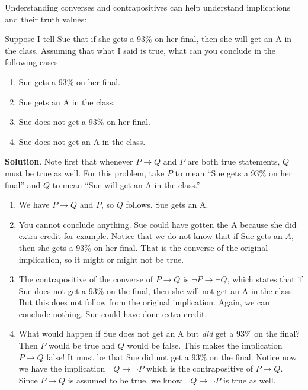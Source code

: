 \documentclass[11pt,]{book}
\theoremstyle{ptxplainnotitle}
\theoremstyle{ptxplaintitle}
\theoremstyle{ptxdefinitionnotitle}
\theoremstyle{ptxdefinitiontitle}
\theoremstyle{ptxdefinitionnotitle}
\theoremstyle{ptxdefinitiontitle}
\theoremstyle{ptxdefinitionnotitle}
\theoremstyle{ptxdefinitiontitle}
\theoremstyle{ptxdefinitiontitlenonumber}
\theoremstyle{ptxdefinitiontitlenonumber}
\numberwithin{equation}{chapter}
\newcommand{\imp}{\rightarrow}
\begin{document}
\hypertarget{p-1843}{}%
Understanding converses and contrapositives can help understand implications and their truth values:%
\begin{example}\label{example-52}
\hypertarget{p-1844}{}%
Suppose I tell Sue that if she gets a 93\% on her final, then she will get an A in the class. Assuming that what I said is true, what can you conclude in the following cases:%
\par
\hypertarget{p-1845}{}%
\leavevmode%
\begin{enumerate}
\item\hypertarget{li-783}{}\hypertarget{p-1846}{}%
Sue gets a 93\% on her final.%
\item\hypertarget{li-784}{}\hypertarget{p-1847}{}%
Sue gets an A in the class.%
\item\hypertarget{li-785}{}\hypertarget{p-1848}{}%
Sue does not get a 93\% on her final.%
\item\hypertarget{li-786}{}\hypertarget{p-1849}{}%
Sue does not get an A in the class.%
\end{enumerate}
%
\par\smallskip%
\noindent\textbf{Solution}.\hypertarget{solution-234}{}\quad%
\hypertarget{p-1850}{}%
Note first that whenever \(P \imp Q\) and \(P\) are both true statements, \(Q\) must be true as well. For this problem, take \(P\) to mean ``Sue gets a 93\% on her final'' and \(Q\) to mean ``Sue will get an A in the class.''%
\par
\hypertarget{p-1851}{}%
\leavevmode%
\begin{enumerate}
\item\hypertarget{li-787}{}\hypertarget{p-1852}{}%
We have \(P \imp Q\) and \(P\), so \(Q\) follows. Sue gets an A.%
\item\hypertarget{li-788}{}\hypertarget{p-1853}{}%
You cannot conclude anything. Sue could have gotten the A because she did extra credit for example. Notice that we do not know that if Sue gets an \(A\), then she gets a 93\% on her final. That is the converse of the original implication, so it might or might not be true.%
\item\hypertarget{li-789}{}\hypertarget{p-1854}{}%
The contrapositive of the converse of \(P \imp Q\) is \(\neg P \imp \neg Q\), which states that if Sue does not get a 93\% on the final, then she will not get an A in the class. But this does not follow from the original implication. Again, we can conclude nothing. Sue could have done extra credit.%
\item\hypertarget{li-790}{}\hypertarget{p-1855}{}%
What would happen if Sue does not get an A but \emph{did} get a 93\% on the final? Then \(P\) would be true and \(Q\) would be false. This makes the implication \(P \imp Q\) false! It must be that Sue did not get a 93\% on the final. Notice now we have the implication \(\neg Q \imp \neg P\) which is the contrapositive of \(P \imp Q\). Since \(P \imp Q\) is assumed to be true, we know \(\neg Q \imp \neg P\) is true as well.%
\end{enumerate}
%
\end{example}
\end{document}
